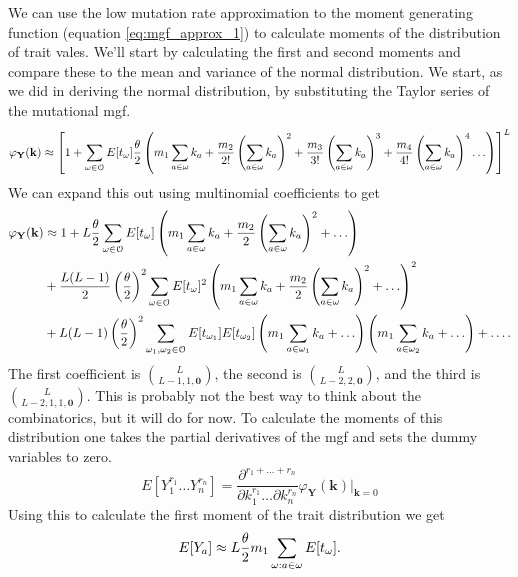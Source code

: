 We can use the low mutation rate approximation to the moment generating function
(equation \ref{eq:mgf_approx_1}) to calculate moments of the distribution of
trait vales. We'll start by calculating the first and second moments and compare
these to the mean and variance of the normal distribution. We start, as we did
in deriving the normal distribution, by substituting the Taylor series of the
mutational mgf.
\begin{equation}
  \label{eq:mgf_approx_sub}
  \varphi_{\mathbf{Y}}(\mathbf{k}) \approx \left[ 1 + \sum_{\omega \in \mathcal{O}}
    E[t_\omega] \frac{\theta}{2} \left( m_1 \sum_{a \in \omega} k_a +
    \frac{m_2}{2!}\left( \sum_{a \in \omega} k_a\right)^2 +
    \frac{m_3}{3!}\left( \sum_{a \in \omega} k_a\right)^3 +
    \frac{m_4}{4!}\left( \sum_{a \in \omega} k_a\right)^4 \ldots \right) \right]^L
\end{equation}
We can expand this out using multinomial coefficients to get
\begin{align}
  \label{eq:mgf_approx_expand}
  \varphi_{\mathbf{Y}}(\mathbf{k}) &\approx 1 +
  L\frac{\theta}{2} \sum_{\omega \in \mathcal{O}} E[t_{\omega}]\left( m_1 \sum_{a \in \omega} k_a +
  \frac{m_2}{2}\left( \sum_{a \in \omega} k_a\right)^2 + \ldots \right) \nonumber \\
  &+ \frac{L(L-1)}{2} \left(\frac{\theta}{2}\right)^2 \sum_{\omega \in \mathcal{O}} E[t_{\omega}]^2
  \left( m_1 \sum_{a \in \omega} k_a +
  \frac{m_2}{2}\left( \sum_{a \in \omega} k_a\right)^2 + \ldots \right)^2 \nonumber \\
  &+ L(L-1)\left(\frac{\theta}{2}\right)^2\sum_{\omega_1, \omega_2 \in \mathcal{O}}E[t_{\omega_1}]E[t_{\omega_2}]
  \left( m_1 \sum_{a \in \omega_1} k_a + \ldots \right)
  \left( m_1 \sum_{a \in \omega_2} k_a + \ldots \right) + \ldots.
\end{align}
The first coefficient is $\binom{L}{L-1,1,\mathbf{0}}$, the second is
$\binom{L}{L-2,2,\mathbf{0}}$, and the third is $\binom{L}{L-2,1,1,\mathbf{0}}$.
This is probably not the best way to think about the combinatorics, but it will
do for now. To calculate the moments of this distribution one takes the partial
derivatives of the mgf and sets the dummy variables to zero.
\begin{equation}
  \label{eq:deriv}
  E[Y_1^{r_1}\ldots Y_n^{r_n}] = \frac{\partial^{r_1 + \ldots + r_n}}{\partial k_1^{r_1} \ldots \partial k_n^{r_n}}
  \varphi_{\mathbf{Y}}(\mathbf{k})\Bigr|_{\mathbf{k}=0}
\end{equation}
Using this to calculate the first moment of the trait distribution we get
\begin{equation}
  \label{eq:mom1}
  E[Y_a] \approx L\frac{\theta}{2} m_1 \sum_{\omega : a \in \omega} E[t_\omega].
\end{equation}
